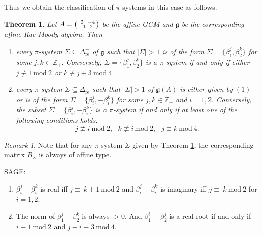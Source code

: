 \documentclass[12pt,reqno]{amsart}
\theoremstyle{plain}
\newtheorem*{thm}{Theorem}
\theoremstyle{definition}
\theoremstyle{remark}
\newtheorem{rem}{Remark}
\newcommand{\lie}[1]{\mathfrak{#1}}
\newcommand\bz{\mathbb Z}
\begin{document}
Thus we obtain the classification of $\pi$-systems in this case as follows.
\begin{thm}\label{thm41}
    Let $A=\begin{psmallmatrix}
        2& -4\\ -1 &2
    \end{psmallmatrix}$ be the affine GCM and $\lie g$ be the corresponding affine Kac-Moody algebra. Then 
    \begin{enumerate}
        \item every $\pi$-system $\Sigma\subseteq \Delta^+_{\mathrm{re}}$ of $\lie g$ such that $|\Sigma|>1$ is of the form $\Sigma=\{\beta_1^j,\beta_2^k\}$ for some $j,k\in\bz_+.$ Conversely, $\Sigma=\{\beta_1^j,\beta_2^k\}$ is a $\pi$-system if and only if either $j\not\equiv 1\ \mathrm{mod}\ 2$ or $k\not\equiv j+3\ \mathrm{mod}\ 4.$
        \item every $\pi$-system $\Sigma\subseteq \Delta_{\mathrm{re}}$ such that $|\Sigma|>1$ of $\lie g(A)$ is either given by $(1)$ or is of the form $\Sigma=\{\beta_i^j,-\beta_i^k\}$ for some $j,k\in\bz_+$ and $i=1,2.$ Conversely, the subset $\Sigma=\{\beta_i^j,-\beta_i^k\}$ is a $\pi$-system if and only if at least one of the following conditions holds.
        $$j\not\equiv i\ \mathrm{mod}\ 2,\ \ \ k\not\equiv i\ \mathrm{mod}\ 2,\ \ \ j\equiv k\ \mathrm{mod}\ 4.$$
    \end{enumerate}
\end{thm}
\begin{rem}
    Note that for any $\pi$-system $\Sigma$ given by Theorem \ref{thm41}, the corresponding matrix $B_{\Sigma}$ is always of affine type.
\end{rem}

\iffalse
{\color{red} SAGE:
\begin{enumerate}
    \item $\beta_i^{j}-\beta_i^{k}$ is real iff $j\equiv\ k+1\ \mathrm{mod}\ 2$ and $\beta_i^{j}-\beta_i^{k}$ is imaginary iff $j\equiv\ k\ \mathrm{mod}\ 2$ for $i=1,2.$
    \item The norm of $\beta_1^j-\beta_2^k$ is always $>0.$ 
    And $\beta_1^i-\beta_2^j$ is a real root if and only if $i\equiv 1\ \mathrm{mod}\ 2$ and $j-i\equiv 3\ \mathrm{mod}\ 4.$
\end{enumerate}


}
\end{document}
